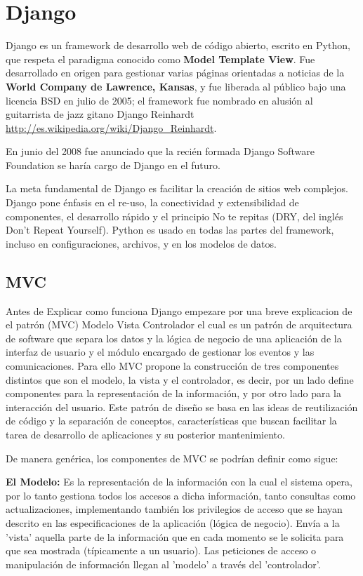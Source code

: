\section{Django}


Django es un framework de desarrollo web de código abierto, escrito en Python,
que respeta el paradigma conocido como {\bfseries Model Template View}. Fue desarrollado en
origen para gestionar varias páginas orientadas a noticias de la
{\bfseries World Company de Lawrence, Kansas}, y fue liberada al público bajo una licencia
BSD en julio de 2005; el framework fue nombrado en alusión al guitarrista de
jazz gitano Django Reinhardt \url{http://es.wikipedia.org/wiki/Django_Reinhardt}.

En junio del 2008 fue anunciado que la recién formada Django Software Foundation
se haría cargo de Django en el futuro.

La meta fundamental de Django es facilitar la creación de sitios web complejos.
Django pone énfasis en el re-uso, la conectividad y extensibilidad de
componentes, el desarrollo rápido y el principio No te repitas
(DRY, del inglés Don't Repeat Yourself). Python es usado en todas las partes
del framework, incluso en configuraciones, archivos, y en los modelos de datos.


\subsection{MVC}

Antes de Explicar como funciona Django empezare por una breve explicacion de
el patr\'on (MVC) Modelo Vista Controlador el cual es un patrón de arquitectura de software que
separa los datos y la lógica de negocio de una aplicación de la interfaz de
usuario y el módulo encargado de gestionar los eventos y las comunicaciones.
Para ello MVC propone la construcción de tres componentes distintos que son el
modelo, la vista y el controlador, es decir, por un lado define componentes
para la representación de la información, y por otro lado para la interacción
 del usuario. Este patrón de diseño se basa en las ideas de reutilización de
 código y la separación de conceptos, características que buscan facilitar la
 tarea de desarrollo de aplicaciones y su posterior mantenimiento.

De manera genérica, los componentes de MVC se podrían definir como sigue:

{\bfseries  El Modelo:} Es la representación de la información con la cual el sistema opera,
por lo tanto gestiona todos los accesos a dicha información, tanto consultas
como actualizaciones, implementando también los privilegios de acceso que se
hayan descrito en las especificaciones de la aplicación (lógica de negocio).
Envía a la 'vista' aquella parte de la información que en cada momento se le
solicita para que sea mostrada (típicamente a un usuario). Las peticiones de
acceso o manipulación de información llegan al 'modelo' a través del
'controlador'.

